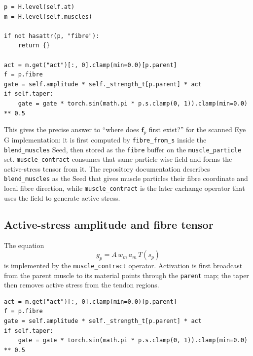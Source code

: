 \documentclass[11pt]{article}
\newcommand{\vect}[1]{\bm{#1}}
\begin{document}
\begin{lstlisting}[caption={\texttt{prototype/eye/muscle\_ops.py}: the dynamics operator reads the stored particle fibre field. Source lines 2371--2388.},label={lst:fibre-read}]
p = H.level(self.at)
m = H.level(self.muscles)

if not hasattr(p, "fibre"):
    return {}

act = m.get("act")[:, 0].clamp(min=0.0)[p.parent]
f = p.fibre
gate = self.amplitude * self._strength_t[p.parent] * act
if self.taper:
    gate = gate * torch.sin(math.pi * p.s.clamp(0, 1)).clamp(min=0.0) ** 0.5
\end{lstlisting}

This gives the precise answer to ``where does $\vect f_p$ first exist?'' for the scanned
Eye G implementation: it is first computed by \texttt{fibre\_from\_s} inside the
\texttt{blend\_muscles} Seed, then stored as the \texttt{fibre} buffer on the
\texttt{muscle\_particle} set. \texttt{muscle\_contract} consumes that same particle-wise
field and forms the active-stress tensor from it. The repository documentation describes
\texttt{blend\_muscles} as the Seed that gives muscle particles their fibre coordinate and
local fibre direction, while \texttt{muscle\_contract} is the later exchange operator that
uses the field to generate active stress.\cite{github:blend,github:contract}

\subsection{Active-stress amplitude and fibre tensor}

The equation
\begin{equation}
g_p=A\,w_m\,a_m\,T(s_p)
\label{eq:auto26}
\end{equation}
is implemented by the \texttt{muscle\_contract} operator. Activation is first broadcast from the parent muscle to its material points through the \texttt{parent} map; the taper then removes active stress from the tendon regions.

\begin{lstlisting}[caption={\texttt{prototype/eye/muscle\_ops.py}: activation, amplitude, and tendon taper.},label={lst:active-gate}]
act = m.get("act")[:, 0].clamp(min=0.0)[p.parent]
f = p.fibre
gate = self.amplitude * self._strength_t[p.parent] * act
if self.taper:
    gate = gate * torch.sin(math.pi * p.s.clamp(0, 1)).clamp(min=0.0) ** 0.5
\end{lstlisting}
\end{document}
